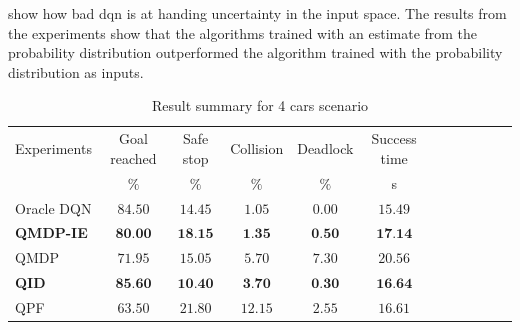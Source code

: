 	

\paperBelief show how bad \gls{dqn} is at handing uncertainty in the input space. The results from the experiments show that the algorithms trained with an estimate from the probability distribution outperformed the algorithm trained with the probability distribution as inputs. 

\begin{table}
	\caption{Result summary for 4 cars scenario}
	\label{tab:results_summary}
	\begin{tabularx}{\columnwidth}{@{}l*{10}{c}c@{}}
	\toprule
	Experiments     & Goal reached & Safe stop & Collision & Deadlock & Success time \\ 
			 & $\%$ & $\%$ & $\%$ & $\%$ & s & \\ 
	\midrule
	Oracle DQN    & $84.50$ & $14.45$ & $1.05$ & $0.00$ & $15.49$\\ %
	\textbf{QMDP-IE}   & $\textbf{80.00}$ & $\textbf{18.15}$ & $\textbf{1.35}$ & $\textbf{0.50}$ & $\textbf{17.14}$ \\ 
	QMDP      & $71.95$ & $15.05$ & $5.70$ & $7.30$ & $20.56$ \\ 
	\textbf{QID}       & $\textbf{85.60}$ & $\textbf{10.40}$ & $\textbf{3.70}$ & $\textbf{0.30}$ & $\textbf{16.64}$ \\ %
	QPF       & $63.50$ & $21.80$ & $12.15$ & $2.55$ & $16.61$ \\ %
	
	\bottomrule
	\end{tabularx}
\end{table}

